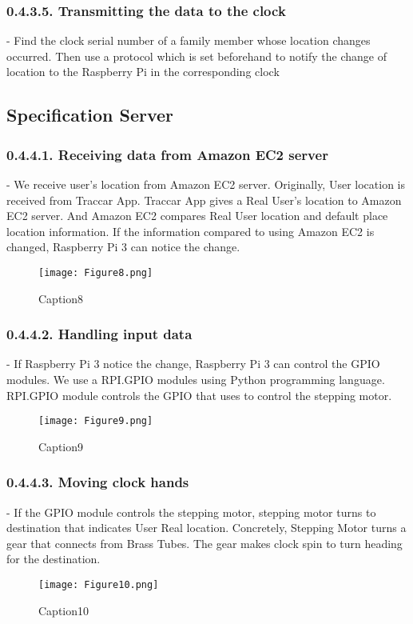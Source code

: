 \documentclass[10pt,a4paper,twocolumn]{report}
\begin{document}
 		\subsubsection{0.4.3.5. Transmitting the data to the clock}
 		- Find the clock serial number of a family member whose location changes occurred. Then use a protocol which is set beforehand to notify the change of location to the Raspberry Pi in the corresponding clock \\
 	\subsection{Specification Server}
 		\subsubsection{0.4.4.1. Receiving data from Amazon EC2 server }
 		- We receive user’s location from Amazon EC2 server. Originally, User location is received from Traccar App.  Traccar App gives a Real User’s location to Amazon EC2 server. And Amazon EC2 compares Real User location and default place location information. If the information compared to using Amazon EC2 is changed, Raspberry Pi 3 can notice the change.
 		\begin{figure}[h]
				\texttt{[image: Figure8.png]}
				\caption{Caption8}
				\label{fig8}
		\end{figure}
 		\subsubsection{0.4.4.2. Handling input data}
 		- If Raspberry Pi 3 notice the change, Raspberry Pi 3 can control the GPIO modules. We use a RPI.GPIO modules using Python programming language. RPI.GPIO module controls the GPIO that uses to control the stepping motor. \\
 		\begin{figure}[h]
				\texttt{[image: Figure9.png]}
				\caption{Caption9}
				\label{fig9}
		\end{figure}
		\subsubsection{0.4.4.3. Moving clock hands}
		- If the GPIO module controls the stepping motor, stepping motor turns to destination that indicates User Real location. Concretely, Stepping Motor turns a gear that connects from Brass Tubes. The gear makes clock spin to turn heading for the destination. \\
		\begin{figure}[h]
				\texttt{[image: Figure10.png]}
				\caption{Caption10}
				\label{fig10}
		\end{figure}
		
\end{document}
